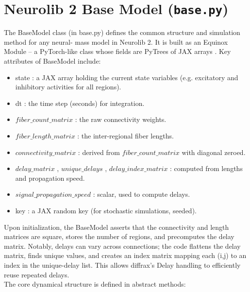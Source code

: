 \documentclass[11pt,a4paper]{article}
\begin{document}
\section{Neurolib 2 Base Model (\texttt{base.py})}

The BaseModel class (in base.py) defines the common structure and simulation method for any neural-
mass model in Neurolib 2. It is built as an Equinox Module – a PyTorch-like class whose fields are
PyTrees of JAX arrays \cite{kidger2021equinox}. Key attributes of BaseModel include:\\

\begin{itemize}

\item 
state : a JAX array holding the current state variables (e.g. excitatory and inhibitory activities for all
regions).

\item 
dt : the time step (seconds) for integration.

\item 
$fiber\_count\_matrix$ : the raw connectivity weights.

\item 
$fiber\_length\_matrix$ : the inter-regional fiber lengths.

\item 
$connectivity\_matrix$ : derived from $fiber\_count\_matrix$ with diagonal zeroed.

\item 
$delay\_matrix$ , $unique\_delays$ , $delay\_index\_matrix$ : computed from lengths and
propagation speed.

\item 
$signal\_propagation\_speed$ : scalar, used to compute delays.

\item 
key : a JAX random key (for stochastic simulations, seeded).
\end{itemize}

Upon initialization, the BaseModel asserts that the connectivity and length matrices are square, stores the
number of regions, and precomputes the delay matrix. Notably, delays can vary across connections; the
code flattens the delay matrix, finds unique values, and creates an index matrix mapping each (i,j) to an
index in the unique-delay list. This allows diffrax’s Delay handling \cite{kidger2021neural} to efficiently reuse repeated delays.\\

The core dynamical structure is defined in abstract methods:\\
\end{document}
